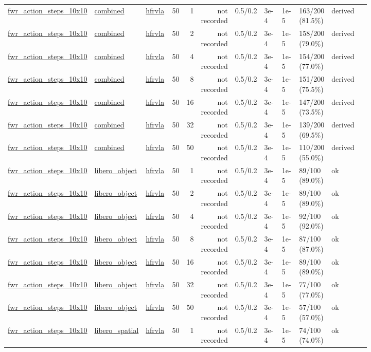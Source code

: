 \begin{tiny}
\begin{longtable}{@{}p{0.18\linewidth}p{0.10\linewidth}p{0.10\linewidth}rrrrp{0.10\linewidth}p{0.08\linewidth}p{0.08\linewidth}p{0.11\linewidth}p{0.07\linewidth}@{}}
\url{fwr_action_steps_10x10} & \url{combined} & \url{hfrvla} & 50 & 1 & not recorded & 0.5/0.2 & 3e-4 & 1e-5 & 163/200 (81.5\%) & derived \\
\url{fwr_action_steps_10x10} & \url{combined} & \url{hfrvla} & 50 & 2 & not recorded & 0.5/0.2 & 3e-4 & 1e-5 & 158/200 (79.0\%) & derived \\
\url{fwr_action_steps_10x10} & \url{combined} & \url{hfrvla} & 50 & 4 & not recorded & 0.5/0.2 & 3e-4 & 1e-5 & 154/200 (77.0\%) & derived \\
\url{fwr_action_steps_10x10} & \url{combined} & \url{hfrvla} & 50 & 8 & not recorded & 0.5/0.2 & 3e-4 & 1e-5 & 151/200 (75.5\%) & derived \\
\url{fwr_action_steps_10x10} & \url{combined} & \url{hfrvla} & 50 & 16 & not recorded & 0.5/0.2 & 3e-4 & 1e-5 & 147/200 (73.5\%) & derived \\
\url{fwr_action_steps_10x10} & \url{combined} & \url{hfrvla} & 50 & 32 & not recorded & 0.5/0.2 & 3e-4 & 1e-5 & 139/200 (69.5\%) & derived \\
\url{fwr_action_steps_10x10} & \url{combined} & \url{hfrvla} & 50 & 50 & not recorded & 0.5/0.2 & 3e-4 & 1e-5 & 110/200 (55.0\%) & derived \\
\url{fwr_action_steps_10x10} & \url{libero_object} & \url{hfrvla} & 50 & 1 & not recorded & 0.5/0.2 & 3e-4 & 1e-5 & 89/100 (89.0\%) & ok \\
\url{fwr_action_steps_10x10} & \url{libero_object} & \url{hfrvla} & 50 & 2 & not recorded & 0.5/0.2 & 3e-4 & 1e-5 & 89/100 (89.0\%) & ok \\
\url{fwr_action_steps_10x10} & \url{libero_object} & \url{hfrvla} & 50 & 4 & not recorded & 0.5/0.2 & 3e-4 & 1e-5 & 92/100 (92.0\%) & ok \\
\url{fwr_action_steps_10x10} & \url{libero_object} & \url{hfrvla} & 50 & 8 & not recorded & 0.5/0.2 & 3e-4 & 1e-5 & 87/100 (87.0\%) & ok \\
\url{fwr_action_steps_10x10} & \url{libero_object} & \url{hfrvla} & 50 & 16 & not recorded & 0.5/0.2 & 3e-4 & 1e-5 & 89/100 (89.0\%) & ok \\
\url{fwr_action_steps_10x10} & \url{libero_object} & \url{hfrvla} & 50 & 32 & not recorded & 0.5/0.2 & 3e-4 & 1e-5 & 77/100 (77.0\%) & ok \\
\url{fwr_action_steps_10x10} & \url{libero_object} & \url{hfrvla} & 50 & 50 & not recorded & 0.5/0.2 & 3e-4 & 1e-5 & 57/100 (57.0\%) & ok \\
\url{fwr_action_steps_10x10} & \url{libero_spatial} & \url{hfrvla} & 50 & 1 & not recorded & 0.5/0.2 & 3e-4 & 1e-5 & 74/100 (74.0\%) & ok \\

\end{longtable}
\end{tiny}
